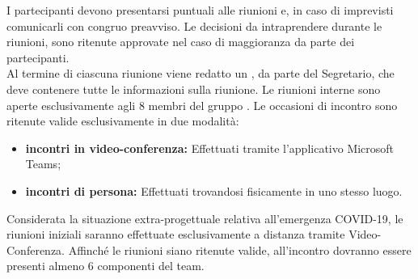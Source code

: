 			I partecipanti devono presentarsi puntuali alle riunioni e, in caso di imprevisti comunicarli con congruo preavviso.
			Le decisioni da intraprendere durante le riunioni, sono ritenute approvate nel caso di maggioranza da parte dei partecipanti.\\
			Al termine di ciascuna riunione viene redatto un \Verbale{}, da parte del Segretario, che deve contenere tutte le informazioni sulla riunione.
				Le riunioni interne sono aperte esclusivamente agli 8 membri del gruppo \Gruppo{}. Le occasioni di incontro sono ritenute valide esclusivamente in due modalità:
				\begin{itemize}
					\item \textbf{incontri in video-conferenza:} Effettuati tramite l'applicativo Microsoft Teams;
					\item \textbf{incontri di persona:} Effettuati trovandosi fisicamente in uno stesso luogo.
				\end{itemize}
				Considerata la situazione extra-progettuale relativa all'emergenza COVID-19, le riunioni iniziali saranno effettuate esclusivamente a distanza tramite Video-Conferenza.
				Affinché le riunioni siano ritenute valide, all'incontro dovranno essere presenti almeno 6 componenti del team.
			
